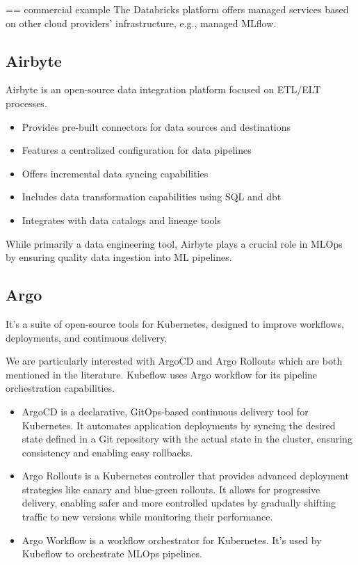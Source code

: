 == commercial example
The Databricks platform offers managed services based on
other cloud providers’ infrastructure, e.g., managed
MLflow.

\subsection{Airbyte}
Airbyte is an open-source data integration platform focused on ETL/ELT processes\cite{airbyte}.

\begin{itemize}
\item Provides pre-built connectors for data sources and destinations
\item Features a centralized configuration for data pipelines
\item Offers incremental data syncing capabilities
\item Includes data transformation capabilities using SQL and dbt
\item Integrates with data catalogs and lineage tools
\end{itemize}

While primarily a data engineering tool, Airbyte plays a crucial role in MLOps by ensuring quality data ingestion into ML pipelines.

\subsection{Argo}\label{subsec:argo}\cite{argo}
It's a suite of open-source tools for Kubernetes, designed to improve workflows, deployments, and continuous delivery.

We are particularly interested with ArgoCD and Argo Rollouts which are both mentioned in the literature\cite{inproceedings}.
Kubeflow uses Argo workflow for its pipeline orchestration capabilities.

\begin{itemize}
    \item ArgoCD
     is a declarative, GitOps-based continuous delivery tool for Kubernetes.
     It automates application deployments by syncing the desired state
     defined in a Git repository with the actual state in the cluster,
     ensuring consistency and enabling easy rollbacks.

    \item Argo Rollouts
     is a Kubernetes controller that provides advanced deployment strategies
     like canary and blue-green rollouts.
     It allows for progressive delivery, enabling safer and more controlled updates by gradually
     shifting traffic to new versions while monitoring their performance.

    \item Argo Workflow
    is a workflow orchestrator for Kubernetes.
    It's used by Kubeflow to orchestrate MLOps pipelines.
\end{itemize}

